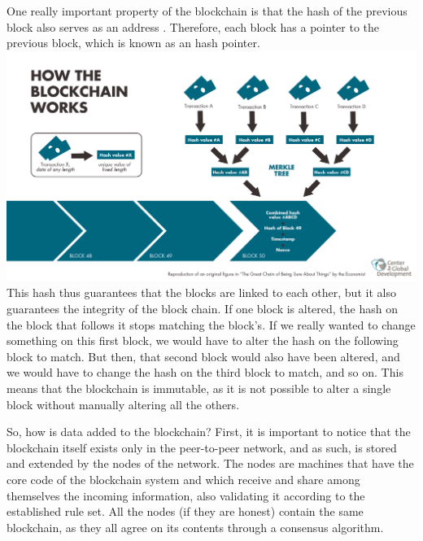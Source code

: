     One really important property of the blockchain is that the hash of the previous block also serves as an address . Therefore, each block has a pointer to the previous block, which is known as an hash pointer. %
    \includegraphics[scale=0.35]{media/Blockchain_workflow.png}
    This hash thus guarantees that the blocks are linked to each other, but it also guarantees the integrity of the block chain. If one block is altered, the hash on the block that follows it stops matching the block's. If we really wanted to change something on this  first block, we would have to alter the hash on the following block to match. But then, that second block would also have been altered, and we would have to change the hash on the third block to match, and so on. This means that the blockchain is immutable, as it is not possible to alter a single block without manually altering all the others. 
    
    So, how is data added to the blockchain?  First, it is important to notice that the blockchain itself exists only in the peer-to-peer network, and as such, is stored and extended by the nodes of the network. The nodes are machines that have the core code of the blockchain system and which receive and share among themselves the incoming information, also validating it according to the established rule set. All the nodes (if they are honest) contain the same blockchain, as they all agree on its contents through a consensus algorithm. 
    
